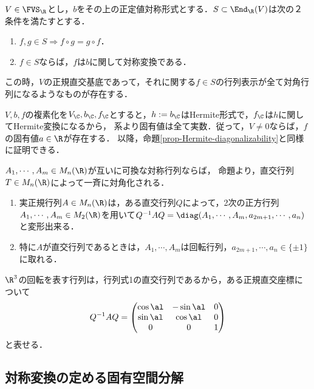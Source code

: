 \documentclass[uplatex, dvipdfmx]{jsreport}
\begin{document}
\begin{proposition}[対称変換の対角化]
    $V\in\FVS_\R$とし，$b$をその上の正定値対称形式とする．$S\subset\End_\R(V)$は次の２条件を満たすとする．
    \begin{enumerate}[(1)]
        \item $f,g\in S\Rightarrow f\circ g=g\circ f$．
        \item $f\in S$ならば，$f$は$b$に関して対称変換である．
    \end{enumerate}
    この時，$V$の正規直交基底であって，それに関する$f\in S$の行列表示が全て対角行列になるようなものが存在する．
\end{proposition}
\begin{Proof}
    $V,b,f$の複素化を$V_\C,b_\C,f_\C$とすると，$h:=b_\C$はHermite形式で，$f_\C$は$h$に関してHermite変換になるから，
    系より固有値は全て実数．従って，$V\ne 0$ならば，$f$の固有値$a\in\R$が存在する．
    以降，命題\ref{prop-Hermite-diagonalizability}と同様に証明できる．
\end{Proof}

\begin{example}[対称行列の一斉対角化]
    $A_1,\cdots,A_m\in M_n(\R)$が互いに可換な対称行列ならば，
    命題より，直交行列$T\in M_n(\R)$によって一斉に対角化される．
\end{example}

\begin{theorem}[実正規行列は対角化不可能！]\mbox{}
    \begin{enumerate}
        \item 実正規行列$A\in M_n(\R)$は，ある直交行列$Q$によって，2次の正方行列$A_1,\cdots,A_m\in M_2(\R)$を用いて$Q^{-1}AQ=\diag(A_1,\cdots,A_m,a_{2m+1},\cdots,a_n)$と変形出来る．
        \item 特に$A$が直交行列であるときは，$A_1,\cdots,A_m$は回転行列，$a_{2m+1},\cdots,a_n\in\{\pm1\}$に取れる．
    \end{enumerate}
\end{theorem}
\begin{remarks}[3次元回転変換]
    $\R^3$の回転を表す行列は，行列式1の直交行列であるから，ある正規直交座標について
    \[Q^{-1}AQ=\begin{pmatrix}\cos\al&-\sin\al&0\\\sin\al&\cos\al&0\\0&0&1\end{pmatrix}\]
    と表せる．
\end{remarks}

\subsection{対称変換の定める固有空間分解}
\end{document}
